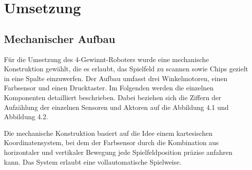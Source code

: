 \chapter{ Umsetzung}
\label{cha:Umsetzung}



\section{Mechanischer Aufbau}
Für die Umsetzung des 4-Gewinnt-Roboters wurde eine mechanische Konstruktion gewählt, die es erlaubt, das Spielfeld zu scannen sowie Chips gezielt in eine Spalte einzuwerfen. Der Aufbau umfasst drei Winkelmotoren, einen Farbsensor und einen Drucktaster. Im Folgenden werden die einzelnen Komponenten detailliert beschrieben. Dabei beziehen sich die Ziffern der Aufzählung der einzelnen Sensoren und Aktoren auf die Abbildung 4.1 und Abbildung 4.2.

Die mechanische Konstruktion basiert auf die Idee einem kartesischen Koordinatensystem, bei dem der Farbsensor durch die Kombination aus horizontaler und vertikaler Bewegung jede Spielfeldposition präzise anfahren kann. Das System erlaubt eine vollautomatische Spielweise.

